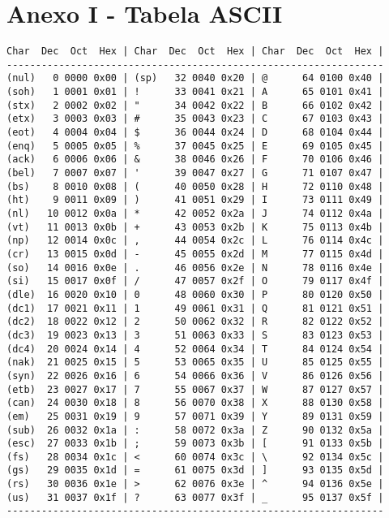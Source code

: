 \section{Anexo I - Tabela ASCII}

\begin{verbatim}
Char  Dec  Oct  Hex | Char  Dec  Oct  Hex | Char  Dec  Oct  Hex |
-----------------------------------------------------------------
(nul)   0 0000 0x00 | (sp)   32 0040 0x20 | @      64 0100 0x40 |
(soh)   1 0001 0x01 | !      33 0041 0x21 | A      65 0101 0x41 |
(stx)   2 0002 0x02 | "      34 0042 0x22 | B      66 0102 0x42 |
(etx)   3 0003 0x03 | #      35 0043 0x23 | C      67 0103 0x43 |
(eot)   4 0004 0x04 | $      36 0044 0x24 | D      68 0104 0x44 |
(enq)   5 0005 0x05 | %      37 0045 0x25 | E      69 0105 0x45 |
(ack)   6 0006 0x06 | &      38 0046 0x26 | F      70 0106 0x46 |
(bel)   7 0007 0x07 | '      39 0047 0x27 | G      71 0107 0x47 |
(bs)    8 0010 0x08 | (      40 0050 0x28 | H      72 0110 0x48 |
(ht)    9 0011 0x09 | )      41 0051 0x29 | I      73 0111 0x49 |
(nl)   10 0012 0x0a | *      42 0052 0x2a | J      74 0112 0x4a |
(vt)   11 0013 0x0b | +      43 0053 0x2b | K      75 0113 0x4b |
(np)   12 0014 0x0c | ,      44 0054 0x2c | L      76 0114 0x4c |
(cr)   13 0015 0x0d | -      45 0055 0x2d | M      77 0115 0x4d |
(so)   14 0016 0x0e | .      46 0056 0x2e | N      78 0116 0x4e |
(si)   15 0017 0x0f | /      47 0057 0x2f | O      79 0117 0x4f |
(dle)  16 0020 0x10 | 0      48 0060 0x30 | P      80 0120 0x50 |
(dc1)  17 0021 0x11 | 1      49 0061 0x31 | Q      81 0121 0x51 |
(dc2)  18 0022 0x12 | 2      50 0062 0x32 | R      82 0122 0x52 |
(dc3)  19 0023 0x13 | 3      51 0063 0x33 | S      83 0123 0x53 |
(dc4)  20 0024 0x14 | 4      52 0064 0x34 | T      84 0124 0x54 |
(nak)  21 0025 0x15 | 5      53 0065 0x35 | U      85 0125 0x55 | 
(syn)  22 0026 0x16 | 6      54 0066 0x36 | V      86 0126 0x56 |
(etb)  23 0027 0x17 | 7      55 0067 0x37 | W      87 0127 0x57 |
(can)  24 0030 0x18 | 8      56 0070 0x38 | X      88 0130 0x58 |
(em)   25 0031 0x19 | 9      57 0071 0x39 | Y      89 0131 0x59 |
(sub)  26 0032 0x1a | :      58 0072 0x3a | Z      90 0132 0x5a |
(esc)  27 0033 0x1b | ;      59 0073 0x3b | [      91 0133 0x5b |
(fs)   28 0034 0x1c | <      60 0074 0x3c | \      92 0134 0x5c |
(gs)   29 0035 0x1d | =      61 0075 0x3d | ]      93 0135 0x5d |
(rs)   30 0036 0x1e | >      62 0076 0x3e | ^      94 0136 0x5e |
(us)   31 0037 0x1f | ?      63 0077 0x3f | _      95 0137 0x5f |
-----------------------------------------------------------------

\end{verbatim}
